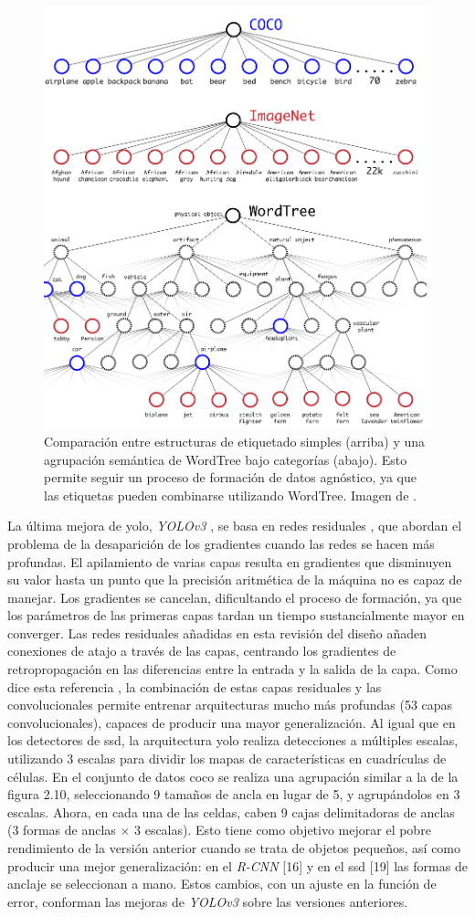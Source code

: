 \begin{figure}[h]
	\centering
	\includegraphics[width=0.6\linewidth]{figures/estado_arte/yolov2_wordtree.png}
	\caption{Comparación entre estructuras de etiquetado simples (arriba) y una agrupación semántica de WordTree bajo categorías (abajo). Esto permite seguir un proceso de formación de datos agnóstico, ya que las etiquetas pueden combinarse utilizando WordTree. Imagen de \cite{yolov2}.}
	\label{fig:2_yolov2_wordtree}
\end{figure}
La última mejora de \acrshort{yolo}, \textit{YOLOv3} \cite{yolov3}, se basa en redes residuales  \cite{resnets}, que abordan el problema de la desaparición de los gradientes cuando las redes se hacen más profundas.
El apilamiento de varias capas resulta en gradientes que disminuyen su valor hasta un punto que la precisión aritmética de la máquina no es capaz de manejar. Los gradientes se cancelan, dificultando el proceso de formación, ya que los parámetros de las primeras capas tardan un tiempo sustancialmente mayor en converger. Las redes residuales añadidas en esta revisión del diseño añaden conexiones de atajo a través de las capas, centrando los gradientes de retropropagación en las diferencias entre la entrada y la salida de la capa. Como dice esta referencia \cite{yolov3}, la combinación de estas capas residuales y las convolucionales permite entrenar arquitecturas mucho más profundas (53 capas convolucionales), capaces de producir una mayor generalización. Al igual que en los detectores de \acrshort{ssd}, la arquitectura \acrshort{yolo} realiza detecciones a múltiples escalas, utilizando 3 escalas para dividir los mapas de características en cuadrículas de células. En el conjunto de datos \acrshort{coco} se realiza una agrupación similar a la de la figura 2.10, seleccionando 9 tamaños de ancla en lugar de 5, y agrupándolos en 3 escalas. Ahora, en cada una de las celdas, caben 9 cajas delimitadoras de anclas (3 formas de anclas × 3 escalas). Esto tiene como objetivo mejorar el pobre rendimiento de la versión anterior cuando se trata de objetos pequeños, así como producir una mejor generalización: en el \textit{R-CNN} [16] y en el \acrshort{ssd} [19] las formas de anclaje se seleccionan a mano. Estos cambios, con un ajuste en la función de error, conforman las mejoras de \textit{YOLOv3} sobre las versiones anteriores.

